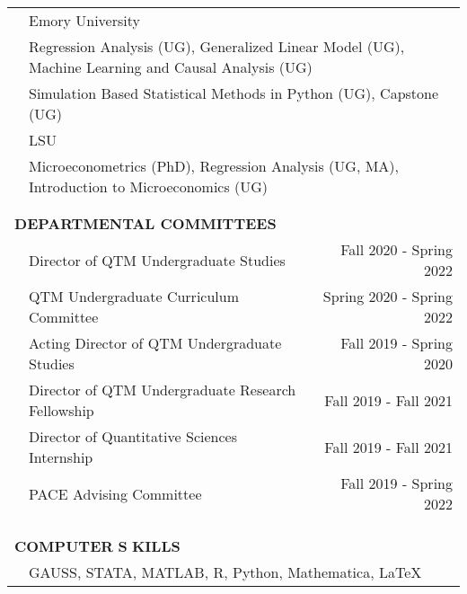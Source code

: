 \documentclass[10pt]{article}
\begin{document}
\begin{center}
\begin{tabular}{llllr}
& \multicolumn{4}{l}{Emory University}\vspace{0.1cm}\\
& \multicolumn{4}{l}{\quad Regression Analysis (UG), Generalized Linear Model (UG), Machine Learning and Causal Analysis (UG)}\vspace{0.1cm}\\
& \multicolumn{4}{l}{\quad Simulation Based Statistical Methods in Python (UG), Capstone (UG)}\vspace{0.1cm}\\
& \multicolumn{4}{l}{LSU}\vspace{0.1cm}\\
& \multicolumn{4}{l}{\quad Microeconometrics (PhD), Regression Analysis (UG, MA), Introduction to Microeconomics (UG)}\vspace{0.1cm}\\
\multicolumn{5}{l}{} \\\\
\multicolumn{5}{l}{{\Large \textbf{D}}\textbf{EPARTMENTAL COMMITTEES}} \vspace{0.1cm}\\
& \multicolumn{3}{l}{Director of QTM Undergraduate Studies}&\multicolumn{1}{r}{Fall 2020 - Spring 2022}\\
& \multicolumn{3}{l}{QTM Undergraduate Curriculum Committee}&\multicolumn{1}{r}{Spring 2020 - Spring 2022}\\
& \multicolumn{3}{l}{Acting Director of QTM Undergraduate Studies}&\multicolumn{1}{r}{Fall 2019 - Spring 2020}\\
& \multicolumn{3}{l}{Director of QTM Undergraduate Research Fellowship}&\multicolumn{1}{r}{Fall 2019 - Fall 2021}\\
& \multicolumn{3}{l}{Director of Quantitative Sciences Internship}&\multicolumn{1}{r}{Fall 2019 - Fall 2021}\\
& \multicolumn{3}{l}{PACE Advising Committee}&\multicolumn{1}{r}{Fall 2019 - Spring 2022}\\
\vspace{0.1cm}\\
\multicolumn{5}{l}{}\\\\
\multicolumn{5}{l}{{\Large \textbf{C}}\textbf{OMPUTER} {\Large \textbf{S}}%
\textbf{KILLS}} \vspace{0.1cm} \\
&\multicolumn{4}{l}{GAUSS, STATA, MATLAB, R, Python, Mathematica, \LaTeX}\\
\end{tabular}




\end{center}
\end{document}
